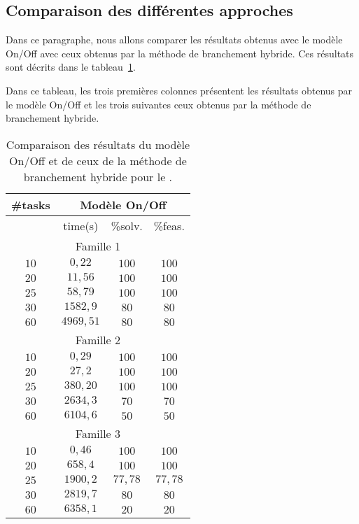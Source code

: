\subsection{Comparaison des différentes approches}

Dans ce paragraphe, nous allons comparer les résultats obtenus avec le
modèle On/Off avec ceux obtenus par la méthode de branchement
hybride. Ces résultats sont décrits dans le
tableau~\ref{tab:comp_OOBB}.

Dans ce tableau, les trois premières colonnes présentent les résultats
obtenus par le modèle On/Off et les trois suivantes ceux obtenus par
la méthode de branchement hybride.   
\begin{table}[!htb]
  \begin{center}
    \begin{tabular}{|c|ccc|}
      \hline
      \#tasks & \multicolumn{3}{c|}{Modèle On/Off}\\ 
      \hline 
              & time(s) &\%solv. &\%feas. \\ 
      \hline
      \multicolumn{4}{|c|}{Famille 1}\\
      \hline 
      $10 $& $0,22$ & $100$ & $100 $ \\ 
      $20 $& $11,56$ & $100$ & $100 $ \\ 
      $25 $& $58,79$ & $100$ & $100 $ \\ 
      $30 $& $1582,9$ & $80$ & $80 $ \\ 
      $60 $& $4969,51$ & $80$ & $80 $ \\ 
      \hline 
      \multicolumn{4}{|c|}{Famille 2}\\
      \hline 
      $10 $& $0,29$ & $100$ & $100 $ \\ 
      $20 $& $27,2$ & $100$ & $100 $ \\ 
      $25 $& $380,20$ & $100$ & $100 $ \\ 
      $30 $& $2634,3$ & $70$ & $70 $ \\ 
      $60 $& $6104,6$ & $50$ & $50 $ \\ 
      \hline 
      \multicolumn{4}{|c|}{Famille 3}\\
      \hline 
      $10 $& $0,46$ & $100$ & $100 $ \\ 
      $20 $& $658,4$ & $100$ & $100 $ \\ 
      $25 $& $1900,2$ & $77,78$ & $77,78 $ \\ 
      $30 $& $2819,7$ & $80$ & $80 $ \\ 
      $60 $& $6358,1$ & $20$ & $20 $ \\ 
      \hline 
    \end{tabular}
  \end{center}
  \caption{Comparaison des résultats du modèle On/Off et de ceux de la
    méthode de branchement hybride pour le \CECSP.}
  \label{tab:comp_OOBB}
\end{table}